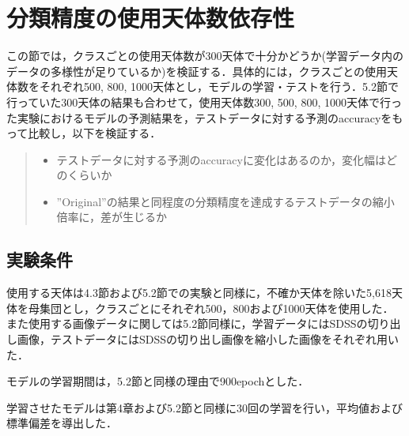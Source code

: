 \documentclass[a4j, 11pt]{jreport}
\begin{document}
\newpage
\section{分類精度の使用天体数依存性}
この節では，クラスごとの使用天体数が300天体で十分かどうか(学習データ内のデータの多様性が足りているか)を検証する．具体的には，クラスごとの使用天体数をそれぞれ500, 800, 1000天体とし，モデルの学習・テストを行う．5.2節で行っていた300天体の結果も合わせて，使用天体数300, 500, 800, 1000天体で行った実験におけるモデルの予測結果を，テストデータに対する予測のaccuracyをもって比較し，以下を検証する．
\begin{quote}
 \begin{itemize}
  \item テストデータに対する予測のaccuracyに変化はあるのか，変化幅はどのくらいか
  \item ''Original''の結果と同程度の分類精度を達成するテストデータの縮小倍率に，差が生じるか
 \end{itemize}
\end{quote}

\subsection{実験条件}
使用する天体は4.3節および5.2節での実験と同様に，不確か天体を除いた5,618天体を母集団とし，クラスごとにそれぞれ500，800および1000天体を使用した．
また使用する画像データに関しては5.2節同様に，学習データにはSDSSの切り出し画像，テストデータにはSDSSの切り出し画像を縮小した画像をそれぞれ用いた．

モデルの学習期間は，5.2節と同様の理由で900epochとした．

学習させたモデルは第4章および5.2節と同様に30回の学習を行い，平均値および標準偏差を導出した．

\end{document}

